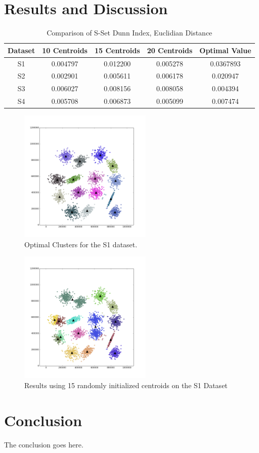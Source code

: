 \documentclass[journal]{IEEEtran}
\begin{document}
\section{Results and Discussion}
\begin{table}[!t]
	
	\renewcommand{\arraystretch}{1.3}
	
	\caption{Comparison of S-Set Dunn Index, Euclidian Distance}
	\label{table_example}
	\centering
	
	\begin{tabular}{|c|c|c|c|c|}
		\hline
		Dataset & 10 Centroids & 15 Centroids & 20 Centroids & Optimal Value\\
		\hline
		
		S1 & 0.004797  & 0.012200 & 0.005278 & 0.0367893\\
		\hline
		S2 & 0.002901 & 0.005611 & 0.006178 & 0.020947\\
		\hline
		S3 & 0.006027 & 0.008156 & 0.008058 & 0.004394\\
		\hline
		S4 & 0.005708 & 0.006873 & 0.005099 & 0.007474\\
		\hline
	\end{tabular}
\end{table}

\begin{figure}[!t]
\centering
\includegraphics[width=2.5in]{../figs/s1_true_euclid_15.png}
\caption{Optimal Clusters for the S1 dataset.}
\label{fig_sim}
\end{figure}

\begin{figure}[!t]
	\centering
	\includegraphics[width=2.5in]{../figs/s1_rand_euclid_15.png}
	\caption{Results using 15 randomly initialized centroids on the S1 Dataset}
	\label{fig_sim}
\end{figure}




\section{Conclusion}


The conclusion goes here.

\ifCLASSOPTIONcaptionsoff
  \newpage
\fi



\end{document}
